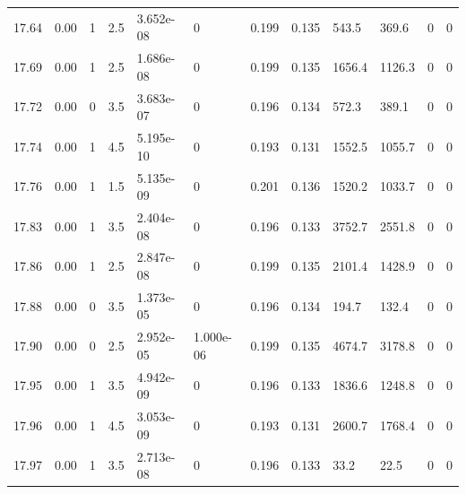 \documentclass[preview]{standalone}
\begin{document}
{{{{{{{{{{{{{{{{{{\begin{tabular}{L{1.2cm}C{1.2cm} C{0.3cm}C{0.5cm} C{1.4cm}C{1.4cm} C{1.4cm}C{1.4cm} C{1.6cm}C{1.6cm} C{1.6cm}C{1.6cm}}
  17.64  &  0.00  & 1     & 2.5 &  3.652e-08  & 0  &  0.199&   0.135& 543.5 & 369.6   &  0 & 0  \\ 
  17.69  &  0.00  & 1     & 2.5 &  1.686e-08  & 0  &  0.199&   0.135& 1656.4 & 1126.3   &  0 & 0  \\ 
  17.72  &  0.00  & 0     & 3.5 &  3.683e-07  & 0  &  0.196&   0.134& 572.3 & 389.1   &  0 & 0  \\ 
  17.74  &  0.00  & 1     & 4.5 &  5.195e-10  & 0  &  0.193&   0.131& 1552.5 & 1055.7   &  0 & 0  \\ 
  17.76  &  0.00  & 1     & 1.5 &  5.135e-09  & 0  &  0.201&   0.136& 1520.2 & 1033.7   &  0 & 0  \\ 
  17.83  &  0.00  & 1     & 3.5 &  2.404e-08  & 0  &  0.196&   0.133& 3752.7 & 2551.8   &  0 & 0  \\ 
  17.86  &  0.00  & 1     & 2.5 &  2.847e-08  & 0  &  0.199&   0.135& 2101.4 & 1428.9   &  0 & 0  \\ 
  17.88  &  0.00  & 0     & 3.5 &  1.373e-05  & 0  &  0.196&   0.134& 194.7 & 132.4   &  0 & 0  \\ 
  17.90  &  0.00  & 0     & 2.5 &  2.952e-05  & 1.000e-06  &  0.199&   0.135& 4674.7 & 3178.8   &  0 & 0  \\ 
  17.95  &  0.00  & 1     & 3.5 &  4.942e-09  & 0  &  0.196&   0.133& 1836.6 & 1248.8   &  0 & 0  \\ 
  17.96  &  0.00  & 1     & 4.5 &  3.053e-09  & 0  &  0.193&   0.131& 2600.7 & 1768.4   &  0 & 0  \\ 
  17.97  &  0.00  & 1     & 3.5 &  2.713e-08  & 0  &  0.196&   0.133& 33.2 & 22.5   &  0 & 0  \\ 
\hline 
\end{tabular} 

}}}}}}}}}}}}}}}}}}
\end{document}
